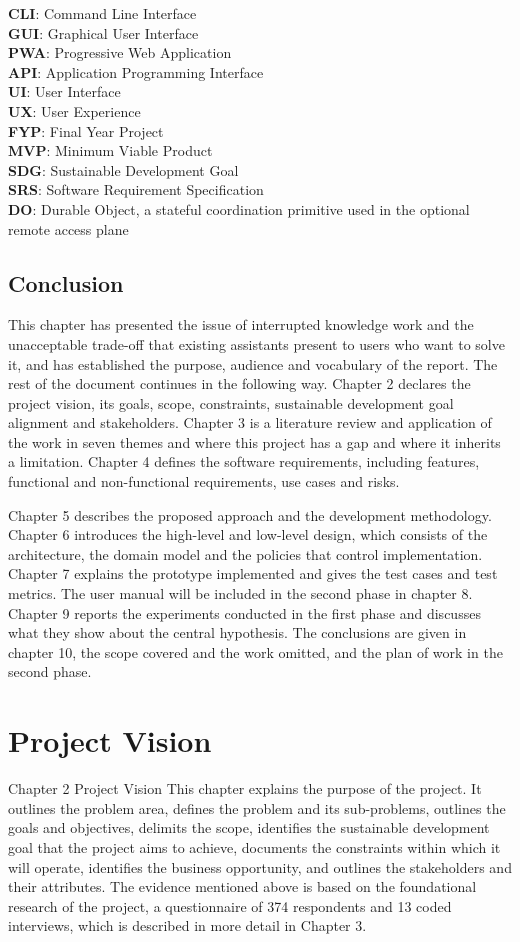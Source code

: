 \documentclass{FastFyp}
\begin{document}
\textbf{CLI}: Command Line Interface\\
\textbf{GUI}: Graphical User Interface\\
\textbf{PWA}: Progressive Web Application\\
\textbf{API}: Application Programming Interface\\
\textbf{UI}: User Interface\\
\textbf{UX}: User Experience\\
\textbf{FYP}: Final Year Project\\
\textbf{MVP}: Minimum Viable Product\\
\textbf{SDG}: Sustainable Development Goal\\
\textbf{SRS}: Software Requirement Specification\\
\textbf{DO}: Durable Object, a stateful coordination primitive used in the optional remote access plane

\section{Conclusion}
This chapter has presented the issue of interrupted knowledge work and the unacceptable trade-off that existing assistants present to users who want to solve it, and has established the purpose, audience and vocabulary of the report. The rest of the document continues in the following way. Chapter 2 declares the project vision, its goals, scope, constraints, sustainable development goal alignment and stakeholders. Chapter 3 is a literature review and application of the work in seven themes and where this project has a gap and where it inherits a limitation. Chapter 4 defines the software requirements, including features, functional and non-functional requirements, use cases and risks.

Chapter 5 describes the proposed approach and the development methodology. Chapter 6 introduces the high-level and low-level design, which consists of the architecture, the domain model and the policies that control implementation. Chapter 7 explains the prototype implemented and gives the test cases and test metrics. The user manual will be included in the second phase in chapter 8. Chapter 9 reports the experiments conducted in the first phase and discusses what they show about the central hypothesis. The conclusions are given in chapter 10, the scope covered and the work omitted, and the plan of work in the second phase.


\chapter{Project Vision}
Chapter 2 Project Vision This chapter explains the purpose of the project. It outlines the problem area, defines the problem and its sub-problems, outlines the goals and objectives, delimits the scope, identifies the sustainable development goal that the project aims to achieve, documents the constraints within which it will operate, identifies the business opportunity, and outlines the stakeholders and their attributes. The evidence mentioned above is based on the foundational research of the project, a questionnaire of 374 respondents and 13 coded interviews, which is described in more detail in Chapter 3.
\end{document}
